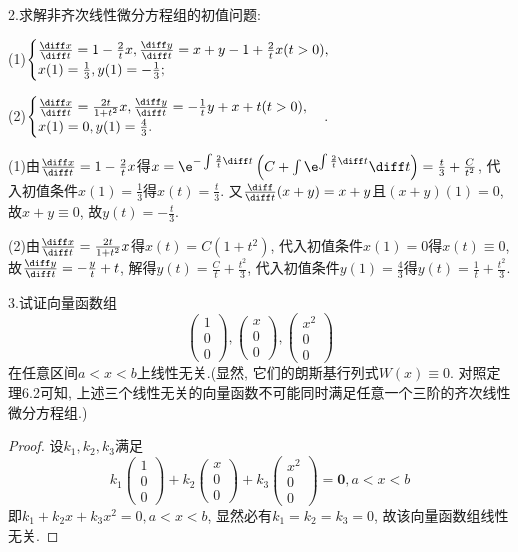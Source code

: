 2.求解非齐次线性微分方程组的初值问题:

(1)$\displaystyle\begin{cases}\frac{\diff x}{\diff t}=1-\frac{2}{t}x,\frac{\diff y}{\diff t}=x+y-1+\frac{2}{t}x(t>0),\\x(1)=\frac{1}{3},y(1)=-\frac{1}{3};\end{cases}$

(2)$\begin{cases}
\frac{\diff x}{\diff t}=\frac{2t}{1+t^2}x,\frac{\diff y}{\diff t}=-\frac{1}{t}y+x+t(t>0),\\
x(1)=0,y(1)=\frac{4}{3}.
\end{cases}$.

\begin{solve}
(1)由$\frac{\diff x}{\diff t}=1-\frac{2}{t}x$得$x=\e^{-\int\frac{2}{t}\diff t}\left(C+\int\e^{\int\frac{2}{t}\diff t}\diff t\right)=\frac{t}{3}+\frac{C}{t^2}$, 
代入初值条件$x(1)=\frac{1}{3}$得$x(t)=\frac{t}{3}$. 又$\frac{\diff}{\diff t}(x+y)=x+y$且$(x+y)(1)=0$, 
故$x+y\equiv0$, 故$y(t)=-\frac{t}{3}$.

(2)由$\frac{\diff x}{\diff t}=\frac{2t}{1+t^2}x$得$x(t)=C(1+t^2)$, 
代入初值条件$x(1)=0$得$x(t)\equiv0$, 故$\frac{\diff y}{\diff t}=-\frac{y}{t}+t$, 
解得$y(t)=\frac{C}{t}+\frac{t^2}{3}$, 代入初值条件$y(1)=\frac{4}{3}$得$y(t)=\frac{1}{t}+\frac{t^2}{3}$.
\end{solve}


3.试证向量函数组
\[\begin{pmatrix}1\\0\\0\end{pmatrix},\begin{pmatrix}x\\0\\0\end{pmatrix},\begin{pmatrix}x^2\\0\\0\end{pmatrix}\]
在任意区间$a<x<b$上线性无关.(显然, 它们的朗斯基行列式$W(x)\equiv0$. 对照定理6.2可知, 
上述三个线性无关的向量函数不可能同时满足任意一个三阶的齐次线性微分方程组.)

\begin{proof}
设$k_1,k_2,k_3$满足
\[k_1\begin{pmatrix}1\\0\\0\end{pmatrix}+k_2\begin{pmatrix}x\\0\\0\end{pmatrix}+k_3\begin{pmatrix}x^2\\0\\0\end{pmatrix}=\bm{0},a<x<b\]
即$k_1+k_2x+k_3x^2=0,a<x<b$, 显然必有$k_1=k_2=k_3=0$, 故该向量函数组线性无关.
\end{proof}


